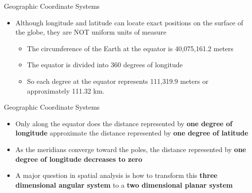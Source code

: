 \documentclass[hyperref={pdfpagelabels=false}]{beamer}
\begin{document}





\begin{frame}{Geographic Coordinate Systems}
	\begin{itemize}
		
		\item Although longitude and latitude can locate exact positions on the surface of the globe, they are NOT uniform units of measure
		\vspace{0.2cm}
		\begin{itemize}
			\item The circumference of the Earth at the equator is 40,075,161.2 meters
			\vspace{0.2cm}
			\item The equator is divided into 360 degrees of longitude
			\vspace{0.2cm}
			\item So each degree at the equator represents 111,319.9 meters or approximately 111.32 km.
		\end{itemize}
		
	\end{itemize}
\end{frame}



\begin{frame}{Geographic Coordinate Systems}
	\begin{itemize}
		\item Only along the equator does the distance represented by \textbf{one degree of longitude} approximate the distance represented by \textbf{one degree of latitude}
		\vspace{0.2cm}
		\item As the meridians converge toward the poles, the distance represented by \textbf{one degree of longitude decreases to zero}
		\vspace{0.2cm}	
		\item A major question in spatial analysis is how to transform this \textbf{three dimensional angular system} to a \textbf{two dimensional planar system}
		
	\end{itemize}
\end{frame}
\end{document}
